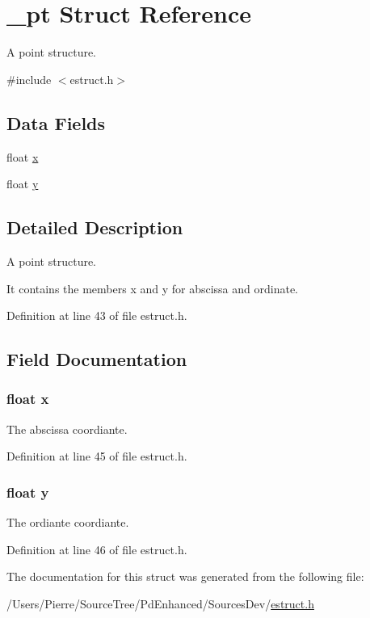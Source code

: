 \hypertarget{struct__pt}{\section{\-\_\-pt Struct Reference}
\label{struct__pt}
}


A point structure.  




{\ttfamily \#include $<$estruct.\-h$>$}

\subsection*{Data Fields}
\begin{DoxyCompactItemize}
\item 
float \hyperlink{struct__pt_ad0da36b2558901e21e7a30f6c227a45e}{x}
\item 
float \hyperlink{struct__pt_aa4f0d3eebc3c443f9be81bf48561a217}{y}
\end{DoxyCompactItemize}


\subsection{Detailed Description}
A point structure. 

It contains the members x and y for abscissa and ordinate. 

Definition at line 43 of file estruct.\-h.



\subsection{Field Documentation}
\hypertarget{struct__pt_ad0da36b2558901e21e7a30f6c227a45e}{
\subsubsection[{x}]{\setlength{\rightskip}{0pt plus 5cm}float x}}\label{struct__pt_ad0da36b2558901e21e7a30f6c227a45e}
The abscissa coordiante. 

Definition at line 45 of file estruct.\-h.

\hypertarget{struct__pt_aa4f0d3eebc3c443f9be81bf48561a217}{
\subsubsection[{y}]{\setlength{\rightskip}{0pt plus 5cm}float y}}\label{struct__pt_aa4f0d3eebc3c443f9be81bf48561a217}
The ordiante coordiante. 

Definition at line 46 of file estruct.\-h.



The documentation for this struct was generated from the following file\-:\begin{DoxyCompactItemize}
\item 
/\-Users/\-Pierre/\-Source\-Tree/\-Pd\-Enhanced/\-Sources\-Dev/\hyperlink{estruct_8h}{estruct.\-h}\end{DoxyCompactItemize}
